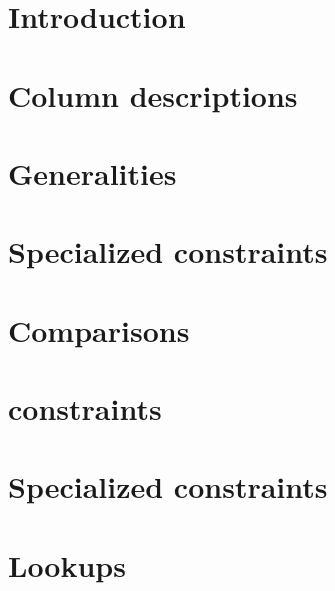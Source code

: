
\section{Introduction}                   \label{rlp auth: intro}                           
\section{Column descriptions}            \label{rlp auth: column descriptions}             
\section{Generalities}                   \label{rlp auth: generalities}                    
\section{Specialized constraints}        \label{rlp auth: specialized constraints}         
\section{Comparisons}                    \label{rlp auth: comparisons}                     
\section{\rlpUtilsMod{} constraints}     \label{rlp auth: rlp utils}                       
\section{Specialized constraints}        \label{rlp auth: specialized}                     
\section{Lookups}                        \label{rlp auth: lookups}                         
